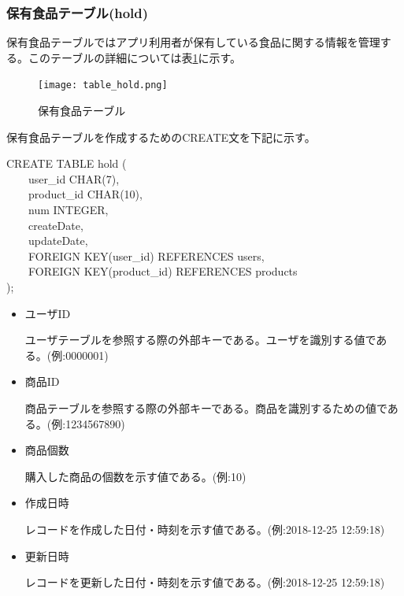 \documentclass[a4j]{jarticle}
\begin{document}
\subsubsection{保有食品テーブル(hold)}

保有食品テーブルではアプリ利用者が保有している食品に関する情報を管理する。このテーブルの詳細については表\ref{table_hold}に示す。

\begin{figure}[H]
  \begin{center}
    \texttt{[image: table\_hold.png]} \\
    \caption{保有食品テーブル}
    \label{table_hold}
  \end{center}
\end{figure}

保有食品テーブルを作成するためのCREATE文を下記に示す。
\begin{screen}
  CREATE TABLE hold (\\
  　　user\_id CHAR(7),\\
  　　product\_id CHAR(10),\\
  　　num INTEGER,\\
  　　createDate,\\
  　　updateDate,\\
  　　FOREIGN KEY(user\_id) REFERENCES users,\\
  　　FOREIGN KEY(product\_id) REFERENCES products\\
  );
\end{screen}
\begin{itemize}
\item ユーザID\par
  ユーザテーブルを参照する際の外部キーである。ユーザを識別する値である。(例:0000001)

\item 商品ID\par
  商品テーブルを参照する際の外部キーである。商品を識別するための値である。(例:1234567890)

\item 商品個数\par
  購入した商品の個数を示す値である。(例:10)

\item 作成日時\par
  レコードを作成した日付・時刻を示す値である。(例:2018-12-25 12:59:18)

\item 更新日時\par
  レコードを更新した日付・時刻を示す値である。(例:2018-12-25 12:59:18)
\end{itemize}
\end{document}
